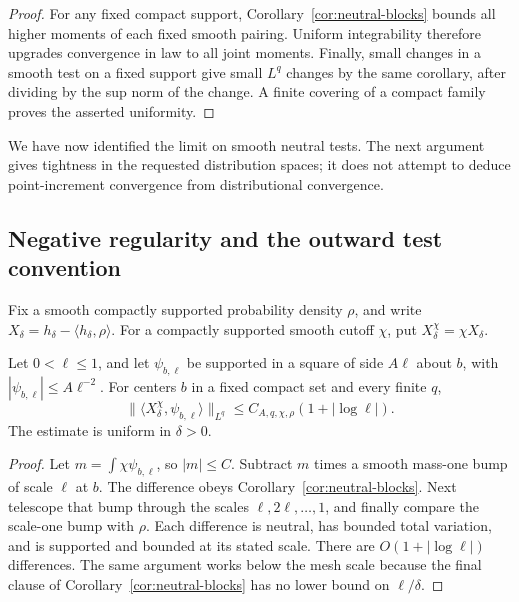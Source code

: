 \begin{proof}
For any fixed compact support, Corollary~\ref{cor:neutral-blocks} bounds
all higher moments of each fixed smooth pairing. Uniform integrability
therefore upgrades convergence in law to all joint moments. Finally,
small changes in a smooth test on a fixed support give small \(L^q\)
changes by the same corollary, after dividing by the sup norm of the
change. A finite covering of a compact family proves the asserted
uniformity.
\end{proof}

We have now identified the limit on smooth neutral tests. The next
argument gives tightness in the requested distribution spaces; it does
not attempt to deduce point-increment convergence from distributional
convergence.

\subsection{Negative regularity and the outward test convention}

Fix a smooth compactly supported probability density \(\rho\), and write
\(X_\delta=h_\delta-\langle h_\delta,\rho\rangle\).
For a compactly supported smooth cutoff \(\chi\), put
\(X_\delta^\chi=\chi X_\delta\).

\begin{lemma}\label{lem:pinned-averages}
Let \(0<\ell\le1\), and let \(\psi_{b,\ell}\) be supported in a square
of side \(A\ell\) about \(b\), with
\(|\psi_{b,\ell}|\le A\ell^{-2}\). For centers \(b\) in a fixed compact
set and every finite \(q\),
\begin{equation}\label{eq:prob-pinned-averages}
 \|\langle X_\delta^\chi,\psi_{b,\ell}\rangle\|_{L^q}
 \le C_{A,q,\chi,\rho}(1+|\log\ell|).
\end{equation}
The estimate is uniform in \(\delta>0\).
\end{lemma}

\begin{proof}
Let \(m=\int\chi\psi_{b,\ell}\), so \(|m|\le C\).
Subtract \(m\) times a smooth mass-one bump of scale \(\ell\) at \(b\).
The difference obeys Corollary~\ref{cor:neutral-blocks}.
Next telescope that bump through the scales
\(\ell,2\ell,\ldots,1\), and finally compare the scale-one bump with
\(\rho\). Each difference is neutral, has bounded total variation,
and is supported and bounded at its stated scale. There are
\(O(1+|\log\ell|)\) differences. The same argument works below the mesh
scale because the final clause of Corollary~\ref{cor:neutral-blocks}
has no lower bound on \(\ell/\delta\).
\end{proof}

